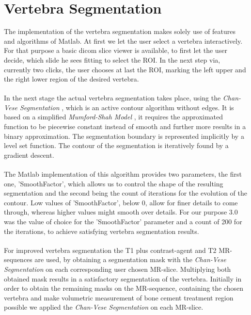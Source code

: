 \documentclass{article}
\begin{document}
  \section{Vertebra Segmentation}
  {
    The implementation of the vertebra segmentation makes solely use of features and algorithms
    of Matlab. At first we let the user select a vertebra interactively. For that purpose a basic 
    dicom slice viewer is available, to first let the user decide, which slide he sees fitting to select the ROI. In the next step via, currently two clicks, the user chooses at last the ROI, marking the left upper and the right lower region of the desired vertebra.\\
    \\In the next stage the actual vertebra segmentation takes place, using the \textit{Chan-Vese Segmentation} \cite{[ChanVese01]}, which is an active contour algorithm without edges. It is based on a simplified \textit{Mumford-Shah Model} \cite{[MumfordShah89]}, it requires the approximated function to be piecewise constant instead of smooth and further more results in a binary approximation. The segmentation boundary is represented implicitly by a level set function. The contour of the segmentation is iteratively found by a gradient descent. \\
    \\ The Matlab implementation of this algorithm provides two parameters, the first one, 'SmoothFactor', which allows us to control the shape of the resulting segmentation and the second being the count of iterations for the evolution of the contour.
    Low values of 'SmoothFactor', below 0, allow for finer details to come through, whereas higher values might smooth over details. For our purpose 3.0 was the value of choice for the 'SmoothFactor' parameter and a count of 200 for the iterations, to achieve satisfying vertebra segmentation results.\\
    \\For improved vertebra segmentation the T1 plus contrast-agent and T2 MR-sequences are used, by obtaining a segmentation mask with the \textit{Chan-Vese Segmentation} \cite{[ChanVese01]} on each corresponding user chosen MR-slice. Multiplying both obtained mask results in a satisfactory segmentation of the vertebra.  
    Initially in order to obtain the remaining masks on the MR-sequence, containing the chosen vertebra and make volumetric measurement of bone cement treatment region possible we applied the \textit{Chan-Vese Segmentation} \cite{[ChanVese01]} on each MR-slice. \newline 
}
\end{document}
